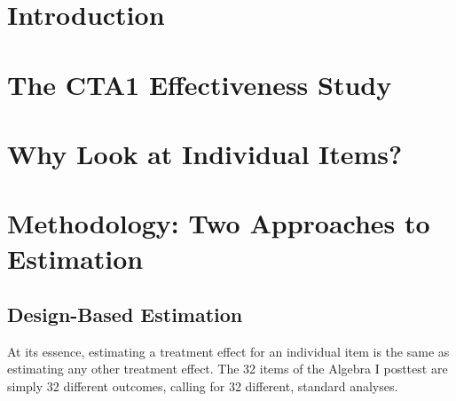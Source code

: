 \documentclass{edm_template}
\begin{document}
\maketitle
\begin{abstract}
This paper provides a sample of a \LaTeX\ document which conforms to
the formatting guidelines for ACM SIG Proceedings.
It complements the document \textit{Author's Guide to Preparing
ACM SIG Proceedings Using \LaTeX$2_\epsilon$\ and Bib\TeX}. This
source file has been written with the intention of being
compiled under \LaTeX$2_\epsilon$\ and BibTeX.

The developers have tried to include every imaginable sort
of ``bells and whistles", such as a subtitle, footnotes on
title, subtitle and authors, as well as in the text, and
every optional component (e.g. Acknowledgments, Additional
Authors, Appendices), not to mention examples of
equations, theorems, tables and figures.

To make best use of this sample document, run it through \LaTeX\
and BibTeX, and compare this source code with the printed
output produced by the dvi file.
\end{abstract}



\section{Introduction}

\section{The CTA1 Effectiveness Study}
\section{Why Look at Individual Items?}

\section{Methodology: Two Approaches to Estimation}
\subsection{Design-Based Estimation}
At its essence, estimating a treatment effect for an individual item
is the same as estimating any other treatment effect.
The 32 items of the Algebra I posttest are simply 32 different
outcomes, calling for 32 different, standard analyses.
\end{document}
